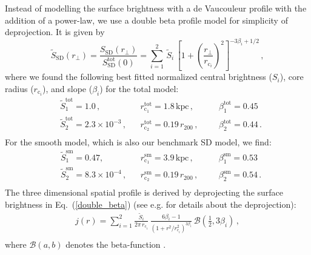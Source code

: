 \documentclass[10pt,aps,pra,reprint,amsmath,amsfonts,amssymb,showpacs,nofootinbib,floatfix]{revtex4-1}
\newcommand{\rmn}{\mathrm}
\newcommand{\sd}{\rmn{SD}}
\newcommand{\rvir}{r_{200}}
\begin{document}
Instead of modelling the surface brightness with a de Vaucouleur
profile with the addition of a power-law, we use a double beta profile
model for simplicity of deprojection. It is given by
\begin{equation}
\tilde{S}_\sd (r_\bot) = \frac{S_\sd (r_\bot)}{S_\rmn{SD}^\rmn{tot}(0)} = 
\sum_{i=1}^2 \,\tilde{S}_i\, 
\left[1 + \left( \frac{r_\bot}{r_{\mathrm{c}_i}}\right)^2\right]
^{-3\beta_i + 1/2}\,,
\label{double_beta}
\end{equation}
where we found the following best fitted normalized central brightness
($S_i$), core radius ($r_{\mathrm{c}_i}$), and slope ($\beta_i$) for
the total model:
\begin{align}
&\tilde{S}_1^\rmn{tot} = 1.0\,,
&&r_{\mathrm{c}_1}^\rmn{tot} = 1.8\,\rmn{kpc}\,,
&&&\beta_1^\rmn{tot} = 0.45\, \nonumber\\
&\tilde{S}_2^\rmn{tot} = 2.3\times10^{-3}\,,
&&r_{\mathrm{c}_2}^\rmn{tot} = 0.19\,\rvir\,,
&&&\beta_2^\rmn{tot} = 0.44\,.\nonumber\\
& && &&&
\label{fit_spatial_IR}
\end{align}
For the smooth model, which is also our benchmark SD model, we find:
\begin{align}
&\tilde{S}_1^\rmn{sm}=0.47,\,
&&r_{\mathrm{c}_1}^\rmn{sm}=3.9\,\rmn{kpc}\,,
&&&\beta_1^\rmn{sm}=0.53 \,\nonumber\\
&\tilde{S}_2^\rmn{sm}=8.3\times10^{-4}\,,
&&r_{\mathrm{c}_2}^\rmn{sm}=0.19\,\rvir\,,
&&&\beta_2^\rmn{sm}=0.54\,.\nonumber\\
& && &&&
\label{fit_spatial_IR_sm}
\end{align}
The three dimensional spatial profile is derived by deprojecting the
surface brightness in Eq.~(\ref{double_beta}) (see
e.g. \cite{2004A&A...413...17P} for details about the deprojection):
\begin{eqnarray}
  j(r)  = \sum_{i=1}^2 \frac{\tilde{S}_i}{2\pi\,r_{\mathrm{c}_i}}\,
  \frac{6 \beta_i - 1}{\left(1 + r^2/r^2_{\mathrm{c}_i}\right)^{3\beta_i}}\,
  \mathcal{B}\left(\frac{1}{2},3\beta_i\right)\,,\nonumber\\
\end{eqnarray}
where $\mathcal{B}(a,b)$ denotes the beta-function
\cite{1965hmfw.book.....A}.
\end{document}
